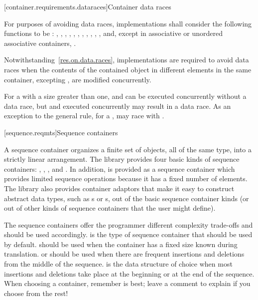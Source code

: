 [container.requirements.dataraces]{Container data races}

\pnum
For purposes of avoiding data races, implementations shall
consider the following functions to be : , ,
, , , , , ,
, , ,  and, except in
associative or unordered associative containers, .

\pnum
Notwithstanding~\ref{res.on.data.races}, implementations are required to avoid data
races when the contents of the contained object in different elements in the same
container, excepting , are modified concurrently.

\pnum
\begin{note}
For a  with a size greater than one, 
and  can be executed concurrently without a data race, but
 and  executed concurrently may result in a data
race.
As an exception to the general rule, for a , 
may race with .
\end{note}

[sequence.reqmts]{Sequence containers}

\pnum
A sequence container organizes a finite set of objects, all of the same type, into a strictly
linear arrangement. The library provides four basic kinds of sequence containers:
, , , and . In addition,
 is provided as a sequence container which provides limited sequence operations
because it has a fixed number of elements. The library also provides container adaptors that
make it easy to construct abstract data types, such as s or s, out of
the basic sequence container kinds (or out of other kinds of sequence containers that the user
might define).

\pnum
\begin{note}
The sequence containers
offer the programmer different complexity trade-offs and should be used
accordingly.
is the type of sequence container that should be used by default.
should be used when the container has a fixed size known during translation.
 or 
should be used when there are frequent insertions and deletions from the
middle of the sequence.
is the data structure of choice
when most insertions and deletions take place at the beginning or at the
end of the sequence.
When choosing a container, remember  is best;
leave a comment to explain if you choose from the rest!
\end{note}

